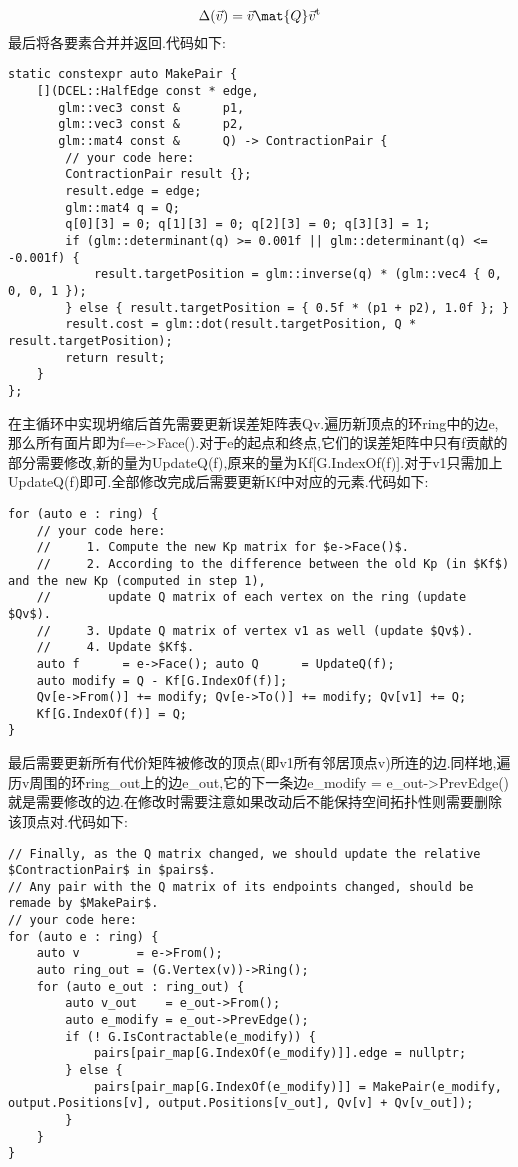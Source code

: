 \documentclass{ctexart}
\begin{document}
\[\Delta(\vec{v})=\vec{v}\mat{Q}\vec{v}^{\text{t}}\]
最后将各要素合并并返回.代码如下:
\begin{lstlisting}
static constexpr auto MakePair {
    [](DCEL::HalfEdge const * edge,
       glm::vec3 const &      p1,
       glm::vec3 const &      p2,
       glm::mat4 const &      Q) -> ContractionPair {
        // your code here:
        ContractionPair result {};
        result.edge = edge;
        glm::mat4 q = Q;
        q[0][3] = 0; q[1][3] = 0; q[2][3] = 0; q[3][3] = 1;
        if (glm::determinant(q) >= 0.001f || glm::determinant(q) <= -0.001f) {
            result.targetPosition = glm::inverse(q) * (glm::vec4 { 0, 0, 0, 1 });
        } else { result.targetPosition = { 0.5f * (p1 + p2), 1.0f }; }
        result.cost = glm::dot(result.targetPosition, Q * result.targetPosition);
        return result;
    }
};
\end{lstlisting}

\indent 在主循环中实现坍缩后首先需要更新误差矩阵表{\codefont Qv}.遍历新顶点的环{\codefont ring}中的边{\codefont e},那么所有面片即为{\codefont f=e->Face()}.对于{\codefont e}的起点和终点,它们的误差矩阵中只有{\codefont f}贡献的部分需要修改,新的量为{\codefont UpdateQ(f)},原来的量为{\codefont Kf[G.IndexOf(f)]}.对于{\codefont v1}只需加上{\codefont UpdateQ(f)}即可.全部修改完成后需要更新{\codefont Kf}中对应的元素.代码如下:
\begin{lstlisting}
for (auto e : ring) {
    // your code here:
    //     1. Compute the new Kp matrix for $e->Face()$.
    //     2. According to the difference between the old Kp (in $Kf$) and the new Kp (computed in step 1),
    //        update Q matrix of each vertex on the ring (update $Qv$).
    //     3. Update Q matrix of vertex v1 as well (update $Qv$).
    //     4. Update $Kf$.
    auto f      = e->Face(); auto Q      = UpdateQ(f);
    auto modify = Q - Kf[G.IndexOf(f)];
    Qv[e->From()] += modify; Qv[e->To()] += modify; Qv[v1] += Q;
    Kf[G.IndexOf(f)] = Q;
}
\end{lstlisting}

\indent 最后需要更新所有代价矩阵被修改的顶点(即{\codefont v1}所有邻居顶点{\codefont v})所连的边.同样地,遍历{\codefont v}周围的环{\codefont ring\_out}上的边{\codefont e\_out},它的下一条边{\codefont e\_modify = e\_out->PrevEdge()}就是需要修改的边.在修改时需要注意如果改动后不能保持空间拓扑性则需要删除该顶点对.代码如下:
\begin{lstlisting}
// Finally, as the Q matrix changed, we should update the relative $ContractionPair$ in $pairs$.
// Any pair with the Q matrix of its endpoints changed, should be remade by $MakePair$.
// your code here:
for (auto e : ring) {
    auto v        = e->From();
    auto ring_out = (G.Vertex(v))->Ring();
    for (auto e_out : ring_out) {
        auto v_out    = e_out->From();
        auto e_modify = e_out->PrevEdge();
        if (! G.IsContractable(e_modify)) {
            pairs[pair_map[G.IndexOf(e_modify)]].edge = nullptr;
        } else {
            pairs[pair_map[G.IndexOf(e_modify)]] = MakePair(e_modify, output.Positions[v], output.Positions[v_out], Qv[v] + Qv[v_out]);
        }
    }
}
\end{lstlisting}
\end{document}
